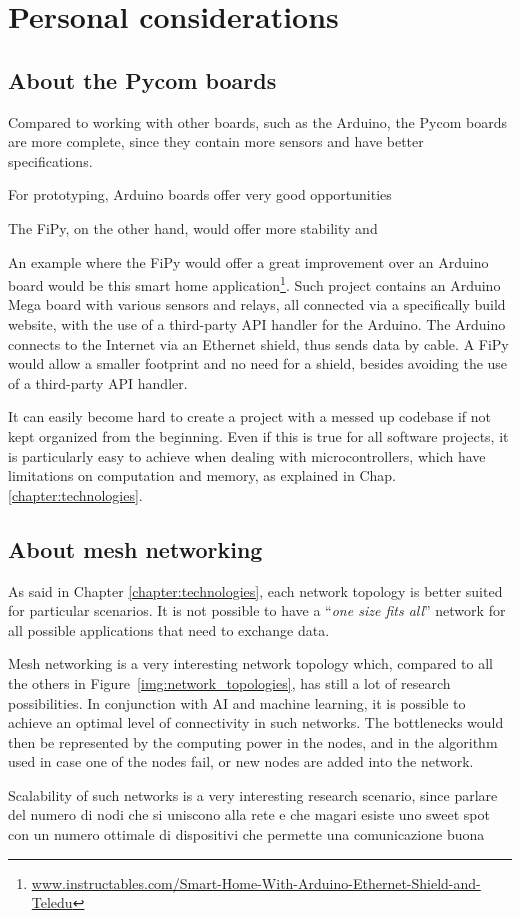 	\section{Personal considerations}
	
		\subsection{About the Pycom boards}
		
			Compared to working with other boards, such as the Arduino, the Pycom boards are more complete, since they contain more sensors and have better specifications.
			
			For prototyping, Arduino boards offer very good opportunities
			
			The FiPy, on the other hand, would offer more stability and 
			
			An example where the FiPy would offer a great improvement over an Arduino board would be this smart home application\footnote{ \url{www.instructables.com/Smart-Home-With-Arduino-Ethernet-Shield-and-Teledu}}.
			Such project contains an Arduino Mega board with various sensors and relays, all connected via a specifically build website, with the use of a third-party API handler for the Arduino.
			The Arduino connects to the Internet via an Ethernet shield, thus sends data by cable.
			A FiPy would allow a smaller footprint and no need for a shield, besides avoiding the use of a third-party API handler.
			
			It can easily become hard to create a project with a messed up codebase if not kept organized from the beginning.
			Even if this is true for all software projects, it is particularly easy to achieve when dealing with microcontrollers, which have limitations on computation and memory, as explained in Chap. \ref{chapter:technologies}.
			
		\subsection{About mesh networking}
		
			As said in Chapter \ref{chapter:technologies}, each network topology is better suited for particular scenarios.
			It is not possible to have a ``\textit{one size fits all}'' network for all possible applications that need to exchange data.
			
			Mesh networking is a very interesting network topology which, compared to all the others in Figure~\ref{img:network_topologies}, has still a lot of research possibilities.
			In conjunction with AI and machine learning, it is possible to achieve an optimal level of connectivity in such networks.
			The bottlenecks would then be represented by the computing power in the nodes, and in the algorithm used in case one of the nodes fail, or new nodes are added into the network.

			Scalability of such networks is a very interesting research scenario, since parlare del numero di nodi che si uniscono alla rete e che magari esiste uno sweet spot con un numero ottimale di dispositivi che permette una comunicazione buona